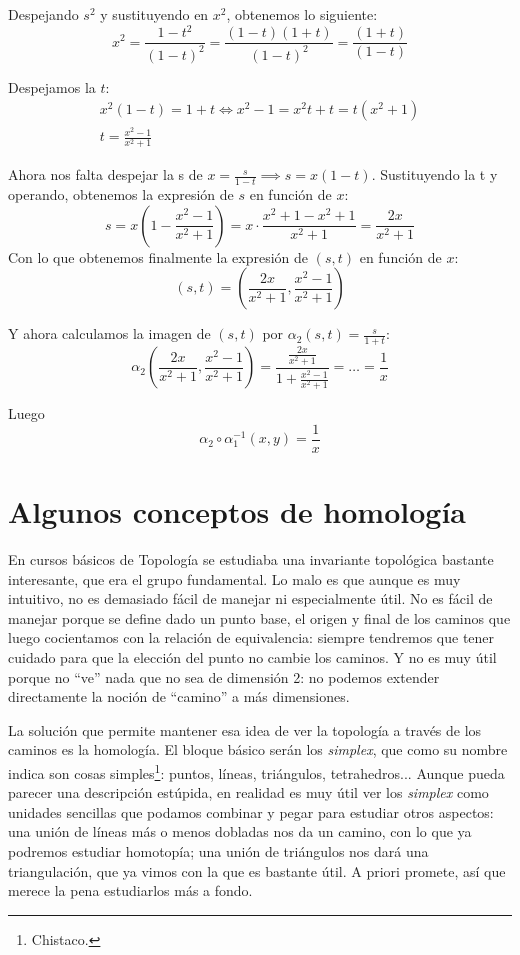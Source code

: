 Despejando $s^2$ y sustituyendo en $x^2$, obtenemos lo siguiente:
\[ x^2 = \frac{1 - t^2}{(1-t)^2} = \frac{(1-t)(1+t)}{(1-t)^2} = \frac{(1+t)}{(1-t)} \]

Despejamos la $t$:
\begin{gather*}
	x^2(1-t) = 1+t \iff x^2 - 1 = x^2t + t = t(x^2 + 1)\\
	t = \frac{x^2 - 1}{x^2 + 1}
\end{gather*}

Ahora nos falta despejar la s de $x = \frac{s}{1-t} \implies s = x (1-t)$. Sustituyendo la t y operando, obtenemos la expresión de $s$ en función de $x$:
\[ s = x \left(1 - \frac{x^2-1}{x^2+1}\right) = x \cdot \frac{x^2 + 1 - x^2 + 1}{x^2+1} = \frac{2x}{x^2+1} \]
Con lo que obtenemos finalmente la expresión de $(s,t)$ en función de $x$:
\[ (s,t) = \left(\frac{2x}{x^2+1}, \frac{x^2-1}{x^2+1}\right) \]

Y ahora calculamos la imagen de $(s,t)$ por $\alpha_2(s,t) = \frac{s}{1+t}$:
\[ \alpha_2\left(\frac{2x}{x^2+1},\frac{x^2-1}{x^2+1}\right) = \frac{\frac{2x}{x^2+1}}{1+\frac{x^2-1}{x^2+1}} = \dots = \frac{1}{x} \]

Luego
\[ \alpha_2 \circ \alpha_1^{-1}(x,y) = \frac{1}{x} \]

\section{Algunos conceptos de homología}


En cursos básicos de Topología \citep{ApuntesTopologia} se estudiaba una invariante topológica bastante interesante, que era el grupo fundamental. Lo malo es que aunque es muy intuitivo, no es demasiado fácil de manejar ni especialmente útil. No es fácil de manejar porque se define dado un punto base, el origen y final de los caminos que luego cocientamos con la relación de equivalencia: siempre tendremos que tener cuidado para que la elección del punto no cambie los caminos. Y no es muy útil porque no ``ve'' nada que no sea de dimensión 2: no podemos extender directamente la noción de ``camino'' a más dimensiones.

La solución que permite mantener esa idea de ver la topología a través de los caminos es la homología. El bloque básico serán los \textit{simplex}, que como su nombre indica son cosas simples\footnote{Chistaco.}: puntos, líneas, triángulos, tetrahedros... Aunque pueda parecer una descripción estúpida, en realidad es muy útil ver los \textit{simplex} como unidades sencillas que podamos combinar y pegar para estudiar otros aspectos: una unión de líneas más o menos dobladas nos da un camino, con lo que ya podremos estudiar homotopía; una unión de triángulos nos dará una triangulación, que ya vimos con la  que es bastante útil. A priori promete, así que merece la pena estudiarlos más a fondo.

